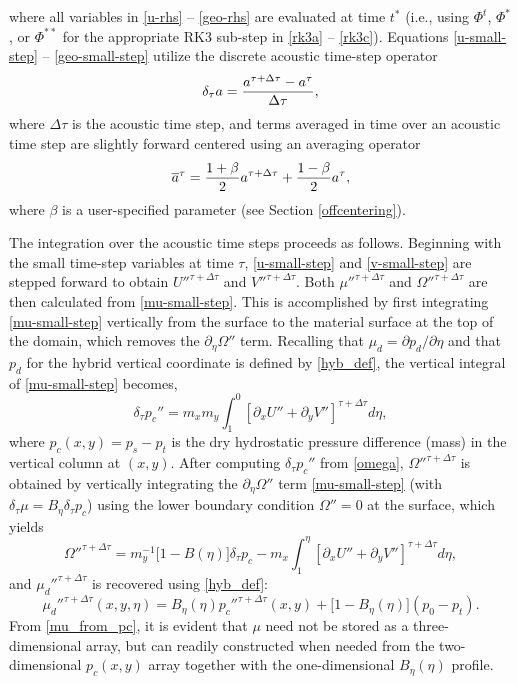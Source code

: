%
\noindent
where all variables in \eqref{u-rhs} -- \eqref{geo-rhs} are evaluated at
time $t^*$ (i.e., using $\Phi^t$, $\Phi^*$, or $\Phi^{**}$ for the
appropriate RK3 sub-step in \eqref{rk3a} -- \eqref{rk3c}).  
Equations \eqref{u-small-step} -- \eqref{geo-small-step} utilize
the discrete
acoustic time-step operator
%
\begin{equation}
\delta_\tau a = { a^{\tau + \Delta \tau} - a^\tau \over \Delta \tau },
\notag
\end{equation}
%
\noindent
where $\Delta \tau$ is the acoustic time step, 
and terms averaged in time over an acoustic time step are slightly forward centered
using an averaging operator 
%
\begin{equation}
\overline{a}^\tau = {1 + \beta \over 2}a^{\tau+\Delta \tau} +
{1 - \beta \over 2}a^{\tau},
\label{avg-operator}
\end{equation}
%
\noindent
where $\beta$ is a user-specified parameter (see Section \ref{offcentering}).

The integration over the acoustic time steps proceeds as follows.
Beginning with the small time-step variables at time $\tau$, 
\eqref{u-small-step}
and \eqref{v-small-step}
are stepped forward to obtain ${U''}^{\tau+\Delta\tau}$ and
${V''}^{\tau+\Delta\tau}$. Both ${\mu''}^{\tau+\Delta\tau}$ and
${\Omega''}^{\tau+\Delta\tau}$ are then calculated from
\eqref{mu-small-step}. 
This is
accomplished by first integrating \eqref{mu-small-step} 
vertically from the surface to the
material surface at the top of the domain, which removes the $\partial_\eta
\Omega''$ term. Recalling that $\mu_d=\partial p_d/\partial\eta$ and that $p_d$
for the hybrid vertical coordinate is defined by \eqref{hyb_def}, the vertical 
integral of \eqref{mu-small-step} becomes,
%
\begin{equation}
  \delta_\tau{p_c}'' = m_x m_y \int_1^0 
 [\partial_x U'' + \partial_y V'']^{\tau+\Delta \tau} 
d\eta,
\label{omega}
\end{equation}
%
where $p_c(x,y)=p_s-p_t$ is the dry hydrostatic pressure difference (mass) in the
vertical column at $(x,y)$.
After computing $\delta_\tau{p_c''}$ from \eqref{omega},
${\Omega''}^{\tau+\Delta\tau}$ is obtained by vertically integrating the
$\partial_\eta \Omega''$ term \eqref{mu-small-step} (with $\delta_\tau\mu=B_\eta\delta _\tau p_c$) using the lower boundary 
condition $\Omega''=0$ at the
surface, which yields
\begin{equation}
{\Omega''}^{\tau+\Delta\tau} = m_y^{-1}\bigl[1-B(\eta)\bigr]\delta_\tau p_c- m_x\int_1^\eta 
 [\partial_x U'' + \partial_y V'']^{\tau+\Delta \tau} 
d\eta,
\label{omega_int}
\end{equation}
%
and $\mu_d''^{\tau+\Delta\tau}$ is recovered using \eqref{hyb_def}: 
\begin{equation}
{\mu_d''}^{\tau+\Delta\tau}(x,y,\eta) = B_\eta(\eta){p_c''}^{\tau+\Delta\tau}(x,y)+\bigl[1-B_\eta(\eta)\bigr](p_0-p_t).
\label{mu_from_pc}
\end{equation}
%
From \eqref{mu_from_pc}, it is evident that $\mu$ need not be stored as a three-dimensional array, but can readily constructed when needed from the two-dimensional $p_c(x,y)$ array together with the one-dimensional $B_\eta(\eta)$ profile.

